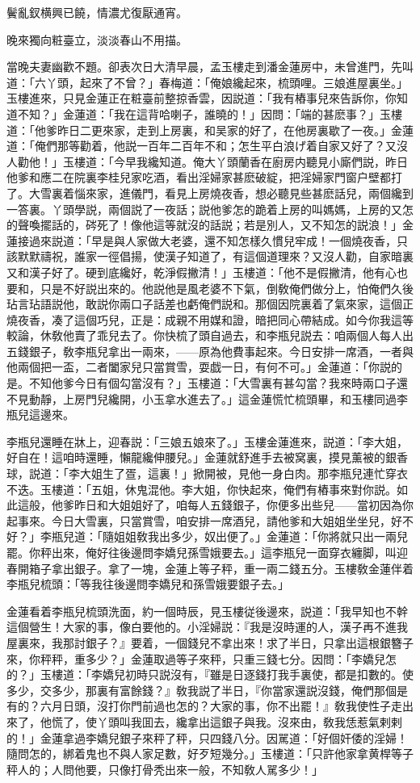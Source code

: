 鬢亂釵横興已饒，情濃尤復厭通宵。

晚來獨向粧臺立，淡淡春山不用描。

當晚夫妻幽歡不題。卻表次日大清早晨，孟玉樓走到潘金蓮房中，未曾進門，先叫道：「六丫頭，起來了不曾？」春梅道：「俺娘纔起來，梳頭哩。三娘進屋裏坐。」玉樓進來，只見金蓮正在粧臺前整掠香雲，因説道：「我有樁事兒來告訴你，你知道不知？」金蓮道：「我在這背哈喇子，誰曉的！」因問：「端的甚麽事？」玉樓道：「他爹昨日二更來家，走到上房裏，和吴家的好了，在他房裏歇了一夜。」金蓮道：「俺們那等勸着，他説一百年二百年不和；怎生平白浪げ着自家又好了？又沒人勸他！」玉樓道：「今早我纔知道。俺大丫頭蘭香在廚房内聽見小廝們説，昨日他爹和應二在院裏李桂兒家吃酒，看出淫婦家甚麽破綻，把淫婦家門窗户壁都打了。大雪裏着惱來家，進儀門，看見上房燒夜香，想必聽見些甚麽話兒，兩個纔到一答裏。丫頭學説，兩個説了一夜話；説他爹怎的跪着上房的叫媽媽，上房的又怎的聲喚擺話的，硶死了！像他這等就沒的話説；若是別人，又不知怎的説浪！」金蓮接過來説道：「早是與人家做大老婆，還不知怎樣久慣兒牢成！一個燒夜香，只該默默禱祝，誰家一徑倡揚，使漢子知道了，有這個道理來？又沒人勸，自家暗裏又和漢子好了。硬到底纔好，乾淨假撇清！」玉樓道：「他不是假撇清，他有心也要和，只是不好説出來的。他説他是風老婆不下氣，倒敎俺們做分上，怕俺們久後玷言玷語説他，敢説你兩口子話差也虧俺們説和。那個因院裏着了氣來家，這個正燒夜香，凑了這個巧兒，正是：成親不用媒和證，暗把同心帶結成。如今你我這等較論，休敎他賣了乖兒去了。你快梳了頭自過去，和李瓶兒説去：咱兩個人每人出五錢銀子，敎李瓶兒拿出一兩來，——原為他費事起來。今日安排一席酒，一者與他兩個把一盃，二者闔家兒只當賞雪，耍戯一日，有何不可。」金蓮道：「你説的是。不知他爹今日有個勾當沒有？」玉樓道：「大雪裏有甚勾當？我來時兩口子還不見動靜，上房門兒纔開，小玉拿水進去了。」這金蓮慌忙梳頭畢，和玉樓同過李瓶兒這邊來。

李瓶兒還睡在牀上，迎春説：「三娘五娘來了。」玉樓金蓮進來，説道：「李大姐，好自在！這咱時還睡，懶龍纔伸腰兒。」金蓮就舒進手去被窝裏，摸見薰被的銀香球，説道：「李大姐生了疍，這裏！」掀開被，見他一身白肉。那李瓶兒連忙穿衣不迭。玉樓道：「五姐，休鬼混他。李大姐，你快起來，俺們有樁事來對你説。如此這般，他爹昨日和大姐姐好了，咱每人五錢銀子，你便多出些兒——當初因為你起事來。今日大雪裏，只當賞雪，咱安排一席酒兒，請他爹和大姐姐坐坐兒，好不好？」李瓶兒道：「隨姐姐敎我出多少，奴出便了。」金蓮道：「你將就只出一兩兒罷。你秤出來，俺好往後邊問李嬌兒孫雪娥要去。」這李瓶兒一面穿衣纏脚，叫迎春開箱子拿出銀子。拿了一塊，金蓮上等子秤，重一兩二錢五分。玉樓敎金蓮伴着李瓶兒梳頭：「等我往後邊問李嬌兒和孫雪娥要銀子去。」

金蓮看着李瓶兒梳頭洗面，約一個時辰，見玉樓従後邊來，説道：「我早知也不幹這個營生！大家的事，像白要他的。小淫婦説：『我是沒時運的人，漢子再不進我屋裏來，我那討銀子？』要着，一個錢兒不拿出來！求了半日，只拿出這根銀簪子來，你秤秤，重多少？」金蓮取過等子來秤，只重三錢七分。因問：「李嬌兒怎的？」玉樓道：「李嬌兒初時只説沒有，『雖是日逐錢打我手裏使，都是扣數的。使多少，交多少，那裏有富餘錢？』敎我説了半日，『你當家還説沒錢，俺們那個是有的？六月日頭，沒打你門前過也怎的？大家的事，你不出罷！』敎我使性子走出來了，他慌了，使丫頭叫我囬去，纔拿出這銀子與我。沒來由，敎我恁惹氣剌剌的！」金蓮拿過李嬌兒銀子來秤了秤，只四錢八分。因駡道：「好個奸倭的淫婦！隨問怎的，綁着鬼也不與人家足數，好歹短幾分。」玉樓道：「只許他家拿黄桿等子秤人的；人問他要，只像打骨秃出來一般，不知敎人駡多少！」

